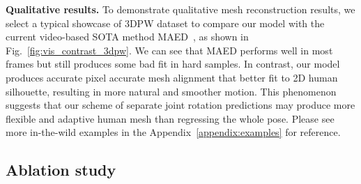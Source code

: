 {\bf Qualitative results.} To demonstrate qualitative mesh reconstruction results, we select a typical showcase of 3DPW dataset to compare our model with the current video-based SOTA method MAED~\citep{maed:wan2021encoder}, as shown in Fig.~\ref{fig:vis_contrast_3dpw}. We can see that MAED performs well in most frames but still produces some bad fit in hard samples. 
In contrast, our model produces accurate pixel accurate mesh alignment that better fit to 2D human silhouette, resulting in more natural and smoother motion. 
This phenomenon suggests that our scheme of separate joint rotation predictions may produce more flexible and adaptive human mesh than regressing the whole pose.
Please see more in-the-wild examples in the Appendix~\ref{appendix:examples} for reference.







\subsection{Ablation study}




\begin{table}[!htbp]\footnotesize
	\caption{Study on the effectiveness of temporal modeling. We evaluate the performances of the image-based  model and two types of video-based temporal models.}
	\label{tab:image_vs_video}
	\centering
	
			\renewcommand{\arraystretch}{1.1}
	\setlength{\tabcolsep}{0.9mm}

	
\end{table}


